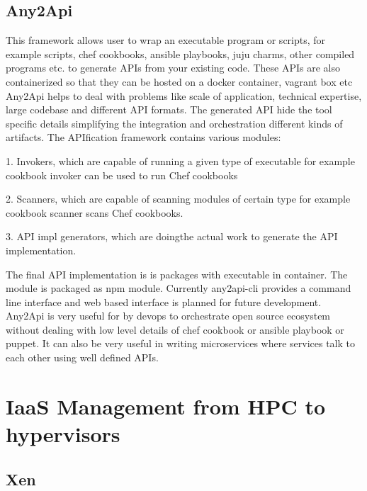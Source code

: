 {\subsection{Any2Api \cv}

     This framework \cite{wettinger-any2api} allows user to wrap an
     executable program or scripts, for example scripts, chef
     cookbooks, ansible playbooks, juju charms, other compiled
     programs etc. to generate APIs from your existing code.  These
     APIs are also containerized so that they can be hosted on a
     docker container, vagrant box etc Any2Api helps to deal with
     problems like scale of application, technical expertise, large
     codebase and different API formats. The generated API hide the
     tool specific details simplifying the integration and
     orchestration different kinds of artifacts. The APIfication
     framework contains various modules:

     1. Invokers, which are capable of running a given type of
        executable for example cookbook invoker can be used to run Chef
        cookbooks

     2. Scanners, which are capable of scanning modules of certain type for
        example cookbook scanner scans Chef cookbooks.

     3. API impl generators, which are doingthe actual work to
        generate the API implementation.

     The final API implementation \cite{www-any2api} is is packages
     with executable in container.  The module is packaged as npm
     module. Currently any2api-cli provides a command line interface
     and web based interface is planned for future
     development. Any2Api is very useful for by devops to orchestrate
     open source ecosystem without dealing with low level details of
     chef cookbook or ansible playbook or puppet. It can also be very
     useful in writing microservices where services talk to each other
     using well defined APIs.

\section{IaaS Management from HPC to hypervisors}
\label{S:o-hypervisors}

\subsection{Xen}

}
